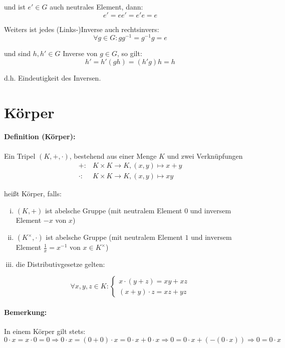 	und ist $e'\in G$ auch neutrales Element, dann:
	\begin{equation*}
		e' = ee' = e'e = e
	\end{equation*}
	
	Weiters ist jedes (Links-)Inverse auch rechtsinvers:
	\begin{equation*}
		\forall g \in G: gg^{-1}=g^{-1}g = e
	\end{equation*}
	
	und sind $h,h'\in G$ Inverse von $g\in G$, so gilt:
	\begin{equation*}
		h' = h'(gh) = (h'g)h = h
	\end{equation*}
	
	d.h. Eindeutigkeit des Inversen.

\section{Körper}
\paragraph{Definition (Körper):}
	Ein Tripel $(K,+,\cdot)$, bestehend aus einer Menge $K$ und zwei Verknüpfungen
	\begin{align*}
		+:&K\times K\to K,(x,y)\mapsto x+y\\
		\cdot : &K\times K\to K, (x,y)\mapsto xy
	\end{align*}
	
	heißt Körper, falls:
	\begin{enumerate}[(i)]
		\item $(K,+)$ ist abelsche Gruppe (mit neutralem Element $0$ und inversem Element $-x$ von $x$)
		\item $(K^\times,\cdot)$ ist abelsche Gruppe (mit neutralem Element $1$ und inversem Element $\frac{1}{x} = x^{-1}$ von $x\in K^\times$)
		\item die Distributivgesetze gelten:
	\end{enumerate}
	
	\begin{equation*}
		\forall x,y,z\in K :\begin{cases}x\cdot (y+z) = xy+xz\\ (x+y)\cdot z = xz+yz \end{cases}
	\end{equation*}

\paragraph{Bemerkung:}
	In einem Körper gilt stets:
	\begin{equation*}
		0\cdot x = x\cdot 0 = 0 \Rightarrow
		0\cdot x = (0+0)\cdot x = 0\cdot x + 0\cdot x \Rightarrow
		0 = 0\cdot x + (-(0\cdot x)) \Rightarrow 0 = 0\cdot x
	\end{equation*}
	
